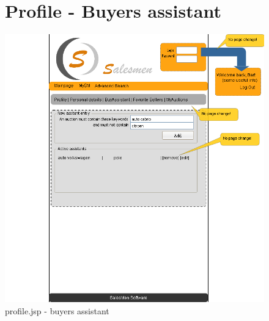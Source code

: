 \documentclass[a4paper, 12pt]{report}
\begin{document}
\begin{figure}
\section{Profile - Buyers assistant}
\label{fig_prototype_buyer_assistant}
\includegraphics[width=15cm]{../../img/SM_mySM_buy_assistant.png}
\caption{profile.jsp - buyers assistant}
\end{figure}
\end{document}
